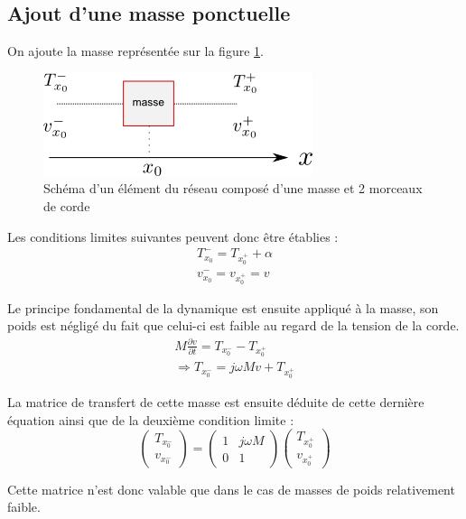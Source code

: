\documentclass[a4paper,11pt]{report} %
\begin{document}
\subsection{Ajout d'une masse ponctuelle}
On ajoute la masse représentée sur la figure \ref{masse_graphic}.

\begin{figure}[h!]
\centering \includegraphics[scale = 1]{./figures/masse_graphic.png}
\caption{Schéma d'un élément du réseau composé d'une masse et 2 morceaux de corde \label{masse_graphic}}
\end{figure}

Les conditions limites suivantes peuvent donc être établies :
\begin{eqnarray*}
T_{x_0}^{-} = T_{x_0^{+}} + \alpha \\
v_{x_0}^{-} = v_{x_0^{+}} = v
\end{eqnarray*}

Le principe fondamental de la dynamique est ensuite appliqué à la masse, son poids est négligé du fait que celui-ci est faible au regard de la tension de la corde.
\begin{eqnarray*}
M \frac{\partial v}{\partial t} = T_{x_0^{-}} - T_{x_0^{+}} \\
\Rightarrow T_{x_0^{-}} = j \omega M v + T_{x_0^{+}}
\end{eqnarray*} 

La matrice de transfert de cette masse est ensuite déduite de cette dernière équation ainsi que de la deuxième condition limite :
\begin{equation}
\begin{pmatrix} T_{x_0^{-}} \\ v_{x_0^{-}} \end{pmatrix} = \begin{pmatrix} 1 & j \omega M \\ 0 & 1 \end{pmatrix}\begin{pmatrix} T_{x_0^{+}} \\ v_{x_0^{+}} \end{pmatrix}
\end{equation}

Cette matrice n'est donc valable que dans le cas de masses de poids relativement faible.
\end{document}
